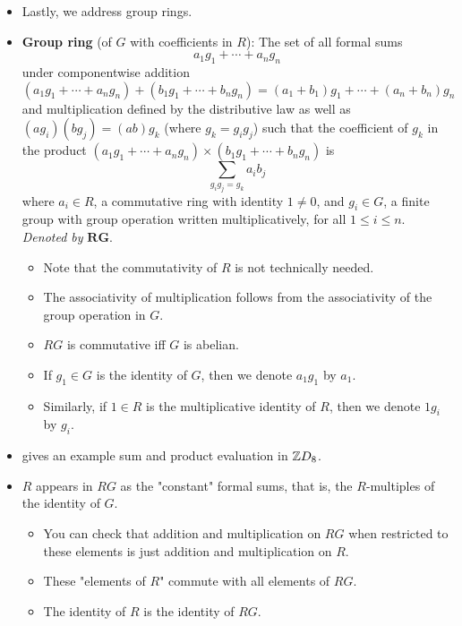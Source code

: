\documentclass[../notes.tex]{subfiles}
\begin{document}
\begin{itemize}
    \item Lastly, we address group rings.
    \item \textbf{Group ring} (of $G$ with coefficients in $R$): The set of all formal sums
    \begin{equation*}
        a_1g_1+\cdots+a_ng_n
    \end{equation*}
    under componentwise addition
    \begin{equation*}
        (a_1g_1+\cdots+a_ng_n)+(b_1g_1+\cdots+b_ng_n) = (a_1+b_1)g_1+\cdots+(a_n+b_n)g_n
    \end{equation*}
    and multiplication defined by the distributive law as well as $(ag_i)(bg_j)=(ab)g_k$ (where $g_k=g_ig_j$) such that the coefficient of $g_k$ in the product $(a_1g_1+\cdots+a_ng_n)\times(b_1g_1+\cdots+b_ng_n)$ is
    \begin{equation*}
        \sum_{g_ig_j=g_k}a_ib_j
    \end{equation*}
    where $a_i\in R$, a commutative ring with identity $1\neq 0$, and $g_i\in G$, a finite group with group operation written multiplicatively, for all $1\leq i\leq n$. \emph{Denoted by} $\bm{RG}$.
    \begin{itemize}
        \item Note that the commutativity of $R$ is not technically needed.
        \item The associativity of multiplication follows from the associativity of the group operation in $G$.
        \item $RG$ is commutative iff $G$ is abelian.
        \item If $g_1\in G$ is the identity of $G$, then we denote $a_1g_1$ by $a_1$.
        \item Similarly, if $1\in R$ is the multiplicative identity of $R$, then we denote $1g_i$ by $g_i$.
    \end{itemize}
    \item \textcite{bib:DummitFoote} gives an example sum and product evaluation in $\mathbb{Z} D_8$.
    \item $R$ appears in $RG$ as the "constant" formal sums, that is, the $R$-multiples of the identity of $G$.
    \begin{itemize}
        \item You can check that addition and multiplication on $RG$ when restricted to these elements is just addition and multiplication on $R$.
        \item These "elements of $R$" commute with all elements of $RG$.
        \item The identity of $R$ is the identity of $RG$.

\end{itemize}
\end{itemize}
\end{document}
